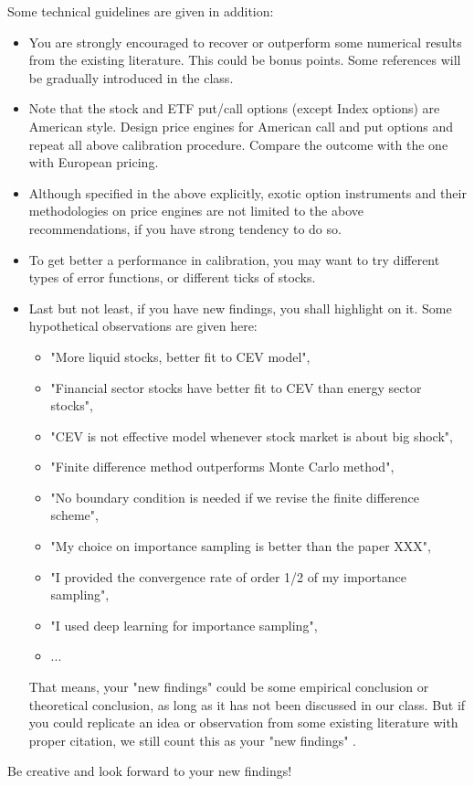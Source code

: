 \documentclass{article}
\begin{document}
Some technical guidelines are given in addition:
\begin{itemize}
 \item You are strongly 
 encouraged to recover or outperform 
 some numerical results from the existing literature. 
 This could be bonus points. Some references will be gradually
 introduced in the class.
 
 
\item Note that the stock and ETF put/call options (except Index options) are American style. Design price engines for American call and put options and repeat all above calibration procedure.
Compare the outcome with the one with European pricing.



 \item Although specified in the above explicitly, 
 exotic option instruments and their methodologies on price engines are not limited to the above 
 recommendations, 
 if you have strong tendency to do so.
 
  
 \item To get better a performance in calibration, you
may want to try different types of error functions, or different ticks of stocks. 

\item Last but not least, if you have new findings, you shall highlight on it. 
Some hypothetical observations are given here: 
\begin{itemize}
 \item "More liquid stocks, better fit to CEV model", 
 \item 
"Financial sector stocks have better fit to CEV than energy sector stocks", 
\item 
"CEV is not effective model whenever stock market is about big shock", 
\item 
"Finite difference method outperforms Monte Carlo method",
\item 
"No boundary condition is needed if we revise the finite difference scheme", 
\item
"My choice on importance sampling is better than 
the paper XXX", 
\item 
"I provided the convergence rate of order 1/2 of my importance sampling",
\item 
"I used deep learning for importance sampling", 
\item ...
\end{itemize}





That means, your "new findings" could be some empirical conclusion 
or theoretical conclusion, as long as it has not been discussed in our class. 
But if you could replicate an idea or observation from some existing literature with proper citation, we still count this as your "new findings" .
\end{itemize}

Be creative and look forward to your new findings!




%
%

\end{document}
